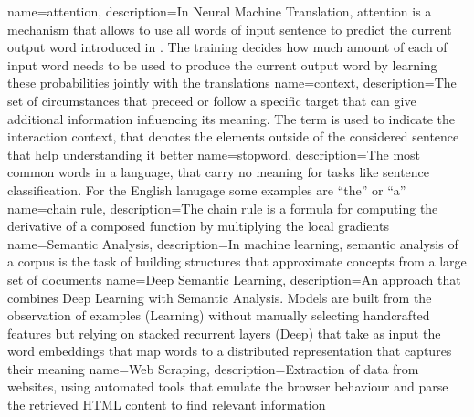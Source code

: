 

{
  name={attention},
  description={In Neural Machine Translation, attention is a mechanism that allows to use all words of input sentence to predict the current output word introduced in \cite{bahdanau2014neural}. The training decides how much amount of each of input word needs to be used to produce the current output word by learning these probabilities jointly with the translations}
}
{
  name={context},
  description={The set of circumstances that preceed or follow a specific target that can give additional information influencing its meaning. The term is used to indicate the interaction context, that denotes the elements outside of the considered sentence that help understanding it better}
}
{
  name={stopword},
  description={The most common words in a language, that carry no meaning for tasks like sentence classification. For the English lanugage some examples are ``the'' or ``a''}
}
{
  name={chain rule},
  description={The chain rule is a formula for computing the derivative of a composed function by multiplying the local gradients}
}
{
  name={Semantic Analysis},
  description={In machine learning, semantic analysis of a corpus is the task of building structures that approximate concepts from a large set of documents}
}
{
  name={Deep Semantic Learning},
  description={An approach that combines Deep Learning with Semantic Analysis. Models are built from the observation of examples (Learning) without manually selecting handcrafted features but relying on stacked recurrent layers (Deep) that take as input the word embeddings that map words to a distributed representation that captures their meaning}
}
{
  name={Web Scraping},
  description={Extraction of data from websites, using automated tools that emulate the browser behaviour and parse the retrieved HTML content to find relevant information}
}
